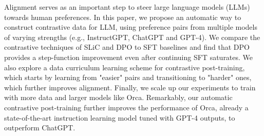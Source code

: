 Alignment serves as an important step to steer large language models (LLMs) towards human preferences. In this paper, we propose an automatic way to construct contrastive data for LLM, using preference pairs from multiple models of varying strengths (e.g., InstructGPT, ChatGPT and GPT-4). We compare the contrastive techniques of SLiC and DPO to SFT baselines and find that DPO provides a step-function improvement even after continuing SFT saturates. We also explore a data curriculum learning scheme for contrastive post-training, which starts by learning from "easier" pairs and transitioning to "harder" ones, which further improves alignment. Finally, we scale up our experiments to train with more data and larger models like Orca. Remarkably, our automatic contrastive post-training further improves the performance of Orca, already a state-of-the-art instruction learning model tuned with GPT-4 outputs, to outperform ChatGPT.